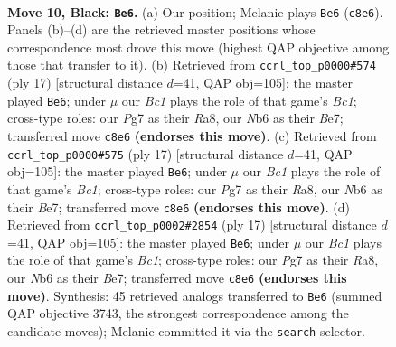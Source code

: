\documentclass[11pt]{article}
\begin{document}
\clearpage

\begin{figure}[p]\centering
\begin{subfigure}{0.46\textwidth}\centering
\resizebox{\linewidth}{!}{%
\newchessgame
\chessboard[
  setfen={1rbq1rk1/ppp1bppp/1nn5/4p2P/P3P3/2N2NP1/1P1P1PB1/R1BQK2R b KQ - 0 10},
  showmover=false,
  pgfstyle=straightmove, color=movearrow, markmove={c8-e6}
]}
\caption{}
\end{subfigure}\hfill
\begin{subfigure}{0.46\textwidth}\centering
\resizebox{\linewidth}{!}{%
\newchessgame
\chessboard[
  setfen={r1bq1rk1/ppp1bppp/1nn5/4p3/1P6/P1N2NP1/3PPPBP/R1BQ1RK1 b - - 0 9},
  showmover=false,
  pgfstyle=straightmove, color=movearrow, markmove={c8-e6}
]}
\caption{}
\end{subfigure}
\\[4pt]
\begin{subfigure}{0.46\textwidth}\centering
\resizebox{\linewidth}{!}{%
\newchessgame
\chessboard[
  setfen={r1bq1rk1/ppp1bppp/1nn5/4p3/1P6/P1N2NP1/3PPPBP/R1BQ1RK1 b - - 0 9},
  showmover=false,
  pgfstyle=straightmove, color=movearrow, markmove={c8-e6}
]}
\caption{}
\end{subfigure}\hfill
\begin{subfigure}{0.46\textwidth}\centering
\resizebox{\linewidth}{!}{%
\newchessgame
\chessboard[
  setfen={r1bq1rk1/ppp1bppp/1nn5/4p3/1P6/P1N2NP1/3PPPBP/R1BQ1RK1 b - - 0 9},
  showmover=false,
  pgfstyle=straightmove, color=movearrow, markmove={c8-e6}
]}
\caption{}
\end{subfigure}
\caption{\textbf{Move 10, Black: \texttt{Be6}.} (a) Our position; Melanie plays \texttt{Be6} (\texttt{c8e6}). Panels (b)--(d) are the retrieved master positions whose correspondence most drove this move (highest QAP objective among those that transfer to it). (b) Retrieved from \texttt{ccrl\_top\_p0000\#574} (ply 17) [structural distance $d$=41, QAP obj=105]: the master played \texttt{Be6}; under $\mu$ our \emph{Bc1} plays the role of that game's \emph{Bc1}; cross-type roles: our \emph{P}g7 as their \emph{R}a8, our \emph{N}b6 as their \emph{B}e7; transferred move \texttt{c8e6} \textbf{(endorses this move)}. (c) Retrieved from \texttt{ccrl\_top\_p0000\#575} (ply 17) [structural distance $d$=41, QAP obj=105]: the master played \texttt{Be6}; under $\mu$ our \emph{Bc1} plays the role of that game's \emph{Bc1}; cross-type roles: our \emph{P}g7 as their \emph{R}a8, our \emph{N}b6 as their \emph{B}e7; transferred move \texttt{c8e6} \textbf{(endorses this move)}. (d) Retrieved from \texttt{ccrl\_top\_p0002\#2854} (ply 17) [structural distance $d$=41, QAP obj=105]: the master played \texttt{Be6}; under $\mu$ our \emph{Bc1} plays the role of that game's \emph{Bc1}; cross-type roles: our \emph{P}g7 as their \emph{R}a8, our \emph{N}b6 as their \emph{B}e7; transferred move \texttt{c8e6} \textbf{(endorses this move)}. Synthesis: 45 retrieved analogs transferred to \texttt{Be6} (summed QAP objective 3743, the strongest correspondence among the candidate moves); Melanie committed it via the \texttt{search} selector.}
\label{fig:thought-m19}
\end{figure}
\end{document}
